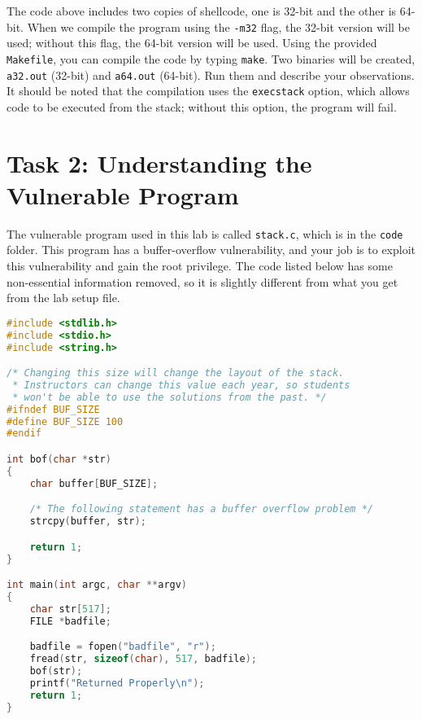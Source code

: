 The code above includes two copies of shellcode, one is 32-bit
and the other is 64-bit. When we compile the program using 
the \texttt{-m32} flag, the 32-bit version will be used; 
without this flag, the 64-bit version will be used. 
Using the provided \texttt{Makefile}, you can compile
the code by typing \texttt{make}. 
Two binaries will be created, \texttt{a32.out} (32-bit)
and \texttt{a64.out} (64-bit). 
Run them and describe your observations. 
It should be noted that the compilation
uses the \texttt{execstack} option, which allows 
code to be executed from the stack; 
without this option, the program will fail.



\section{Task 2: Understanding the Vulnerable Program}
\label{sec:vulnerable_program}

The vulnerable program used in this lab is called 
\texttt{stack.c}, which is in the \texttt{code} folder. 
This program has a buffer-overflow vulnerability,
and your job is to exploit this vulnerability and gain the root privilege. 
The code listed below has some non-essential information removed, 
so it is slightly different from what you get from the lab setup file.


\begin{lstlisting}[language=C, caption={The vulnerable program (\texttt{stack.c})}]
#include <stdlib.h>
#include <stdio.h>
#include <string.h>

/* Changing this size will change the layout of the stack.
 * Instructors can change this value each year, so students
 * won't be able to use the solutions from the past. */
#ifndef BUF_SIZE
#define BUF_SIZE 100
#endif

int bof(char *str)
{
    char buffer[BUF_SIZE];

    /* The following statement has a buffer overflow problem */ 
    strcpy(buffer, str);          

    return 1;
}

int main(int argc, char **argv)
{
    char str[517];
    FILE *badfile;

    badfile = fopen("badfile", "r");
    fread(str, sizeof(char), 517, badfile);
    bof(str);
    printf("Returned Properly\n");
    return 1;
}
\end{lstlisting}


